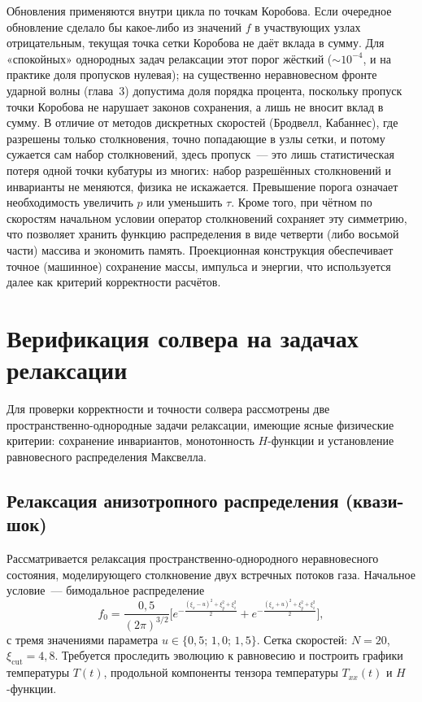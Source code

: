 \documentclass[14pt,a4paper]{extreport}
\numberwithin{equation}{chapter}
\numberwithin{figure}{chapter}
\numberwithin{table}{chapter}
\begin{document}
Обновления применяются внутри цикла по точкам Коробова.
Если очередное обновление сделало бы какое-либо из значений $f$ в участвующих узлах отрицательным, текущая точка сетки
Коробова не даёт вклада в сумму.
Для «спокойных» однородных задач релаксации этот порог жёсткий ($\sim10^{-4}$, и на практике доля пропусков нулевая); на
существенно неравновесном фронте ударной волны (глава~3) допустима доля порядка процента, поскольку пропуск точки
Коробова не нарушает законов сохранения, а лишь не вносит вклад в сумму.
В отличие от методов дискретных скоростей (Бродвелл, Кабаннес), где разрешены только столкновения, точно попадающие в
узлы сетки, и потому сужается сам набор столкновений, здесь пропуск~--- это лишь статистическая потеря одной точки
кубатуры из многих: набор разрешённых столкновений и инварианты не меняются, физика не искажается.
Превышение порога означает необходимость увеличить $p$ или уменьшить $\tau$.
Кроме того, при чётном по скоростям начальном условии оператор столкновений сохраняет эту симметрию, что позволяет
хранить функцию распределения в виде четверти (либо восьмой части) массива и экономить память.
Проекционная конструкция обеспечивает точное (машинное) сохранение массы, импульса и энергии, что используется далее как
критерий корректности расчётов.


\chapter{Верификация солвера на задачах релаксации}

Для проверки корректности и точности солвера рассмотрены две пространственно-однородные задачи релаксации, имеющие ясные
физические критерии: сохранение инвариантов, монотонность $H$-функции и установление равновесного распределения
Максвелла.

\section{Релаксация анизотропного распределения (квази-шок)}

Рассматривается релаксация пространственно-однородного неравновесного состояния, моделирующего столкновение двух
встречных потоков газа.
Начальное условие~--- бимодальное распределение
\begin{equation}
  f_0=\frac{0{,}5}{(2\pi)^{3/2}}\Big[
      e^{-\frac{(\xi_x-u)^2+\xi_y^2+\xi_z^2}{2}}
      +e^{-\frac{(\xi_x+u)^2+\xi_y^2+\xi_z^2}{2}}\Big],
\end{equation}
с тремя значениями параметра $u\in\{0{,}5;\,1{,}0;\,1{,}5\}$.
Сетка скоростей: $N=20$, $\xi_{\mathrm{cut}}=4{,}8$.
Требуется проследить эволюцию к равновесию и построить графики температуры $T(t)$, продольной компоненты тензора
температуры $T_{xx}(t)$ и $H$-функции.
\end{document}
